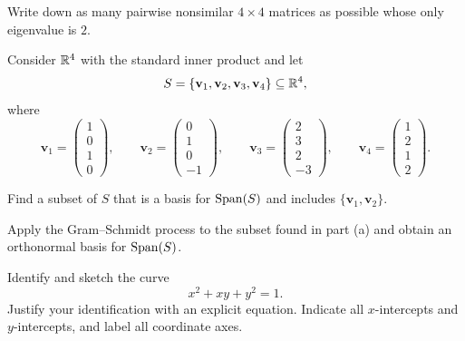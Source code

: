 \documentclass[11pt,oneside]{article}
\begin{document}
\begin{problem}
Write down as many pairwise nonsimilar $4\times4$ matrices as possible whose only eigenvalue is $2$.
\end{problem}

\begin{problem}
Consider $\mathbb{R}^4$ with the standard inner product and let
\[
S=\{\mathbf v_1,\mathbf v_2,\mathbf v_3,\mathbf v_4\}\subseteq\mathbb{R}^4,
\]
where
\[
\mathbf v_1=
\begin{pmatrix}
1\\0\\1\\0
\end{pmatrix},
\qquad
\mathbf v_2=
\begin{pmatrix}
0\\1\\0\\-1
\end{pmatrix},
\qquad
\mathbf v_3=
\begin{pmatrix}
2\\3\\2\\-3
\end{pmatrix},
\qquad
\mathbf v_4=
\begin{pmatrix}
1\\2\\1\\2
\end{pmatrix}.
\]
\begin{problemsubparts}
\item Find a subset of $S$ that is a basis for $\operatorname{Span}(S)$ and includes $\{\mathbf v_1,\mathbf v_2\}$.
\item Apply the Gram--Schmidt process to the subset found in part \textup{(a)} and obtain an orthonormal basis for $\operatorname{Span}(S)$.
\end{problemsubparts}
\end{problem}

\begin{problem}
Identify and sketch the curve
\[
x^2+xy+y^2=1.
\]
Justify your identification with an explicit equation. Indicate all $x$-intercepts and $y$-intercepts, and label all coordinate axes.
\end{problem}
\end{document}
